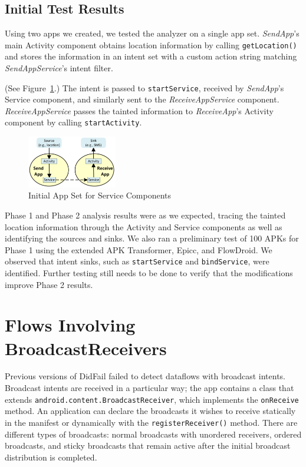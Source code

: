\section{Initial Test Results}
Using two apps we created, we tested the analyzer on a single app set. \emph{SendApp}'s main Activity component obtains location information by calling \texttt{getLocation()} and stores the information in an intent set with a custom action string matching \emph{SendAppService}'s intent filter.

(See Figure~\ref{fig:servicetest1}.) The intent is passed to \texttt{startService}, received by \emph{SendApp}'s Service component, and similarly sent to the \emph{ReceiveAppService} component. \emph{ReceiveAppService} passes the tainted information to \emph{ReceiveApp}'s Activity component by calling \texttt{startActivity}.

\begin{figure}[h]
	\centering
	\includegraphics[width=0.35\textwidth]{serviceapps_v2.png}
	\caption{Initial App Set for Service Components}
	\label{fig:servicetest1}
\end{figure}

Phase 1 and Phase 2 analysis results were as we expected, tracing the tainted location information through the Activity and Service components as well as identifying the sources and sinks. We also ran a preliminary test of 100 APKs for Phase 1 using the extended APK Transformer, Epicc, and FlowDroid. We observed that intent sinks, such as \texttt{startService} and \texttt{bindService}, were identified. Further testing still needs to be done to verify that the modifications improve Phase 2 results.

\chapter{Flows Involving BroadcastReceivers} \label{chap:broadcast_receivers}
Previous versions of DidFail failed to detect dataflows with broadcast intents. Broadcast intents are received in a particular way; the app contains a class that extends \texttt{android.content.BroadcastReceiver}, which implements the \texttt{onReceive} method. An application can declare the broadcasts it wishes to receive statically in the manifest or dynamically with the \texttt{registerReceiver()} method. There are different types of broadcasts: normal broadcasts with unordered receivers, ordered broadcasts, and sticky broadcasts that remain active after the initial broadcast distribution is completed.

